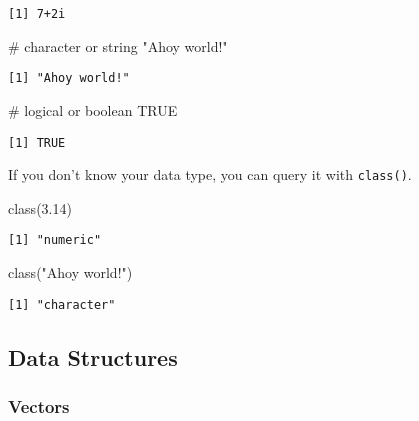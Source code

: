 \documentclass[
  letterpaper,
  DIV=11,
  numbers=noendperiod]{scrartcl}
\newenvironment{Shaded}{\begin{snugshade}}{\end{snugshade}}
\newcommand{\CommentTok}[1]{\textcolor[rgb]{0.37,0.37,0.37}{#1}}
\newcommand{\ConstantTok}[1]{\textcolor[rgb]{0.56,0.35,0.01}{#1}}
\newcommand{\FloatTok}[1]{\textcolor[rgb]{0.68,0.00,0.00}{#1}}
\newcommand{\FunctionTok}[1]{\textcolor[rgb]{0.28,0.35,0.67}{#1}}
\newcommand{\NormalTok}[1]{\textcolor[rgb]{0.00,0.23,0.31}{#1}}
\newcommand{\StringTok}[1]{\textcolor[rgb]{0.13,0.47,0.30}{#1}}
\begin{document}
\begin{verbatim}
[1] 7+2i
\end{verbatim}

\begin{Shaded}
\begin{Highlighting}[]
\CommentTok{\# character or string}
\StringTok{"Ahoy world!"}
\end{Highlighting}
\end{Shaded}

\begin{verbatim}
[1] "Ahoy world!"
\end{verbatim}

\begin{Shaded}
\begin{Highlighting}[]
\CommentTok{\# logical or boolean}
\ConstantTok{TRUE}
\end{Highlighting}
\end{Shaded}

\begin{verbatim}
[1] TRUE
\end{verbatim}

If you don't know your data type, you can query it with
\texttt{class()}.

\begin{Shaded}
\begin{Highlighting}[]
\FunctionTok{class}\NormalTok{(}\FloatTok{3.14}\NormalTok{)}
\end{Highlighting}
\end{Shaded}

\begin{verbatim}
[1] "numeric"
\end{verbatim}

\begin{Shaded}
\begin{Highlighting}[]
\FunctionTok{class}\NormalTok{(}\StringTok{"Ahoy world!"}\NormalTok{)}
\end{Highlighting}
\end{Shaded}

\begin{verbatim}
[1] "character"
\end{verbatim}

\subsection{Data Structures}\label{data-structures}

\subsubsection{Vectors}\label{vectors}
\end{document}

